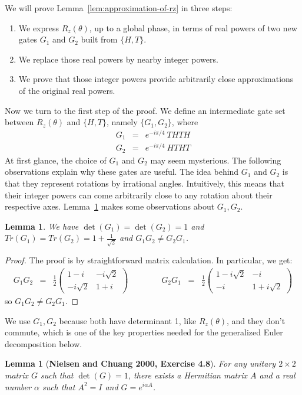 \documentclass[11pt]{article}
\def\({\begin{eqnarray*}}
\def\){\end{eqnarray*}}
\newtheorem{lemma}[theorem]{Lemma}
\begin{document}
We will prove Lemma~\ref{lem:approximation-of-rz} in three steps:
\begin{enumerate}
\item We express $R_z(\theta)$, up to a global phase, in terms of
real powers of two new gates $G_1$ and $G_2$ built from $\{H,T\}$.
\item We replace those real powers by nearby integer powers.
\item We prove that those integer powers provide arbitrarily close
approximations of the original real powers.
\end{enumerate}
%
Now we turn to the first step of the proof.
We define an intermediate gate set between $R_z(\theta)$ and
$\{H, T\}$, namely $\{G_1,G_2\}$, where
\(
G_1 &=& e^{-i\pi/4}\ THTH \\
G_2 &=& e^{-i\pi/4}\ HTHT
\)
At first glance, the choice of $G_1$ and $G_2$ may seem mysterious. 
The following observations explain why these gates are useful.
The idea behind $G_1$ and $G_2$ is that 
they represent rotations by irrational angles.
Intuitively, this means that their integer powers can come arbitrarily close to
any rotation about their respective axes.
Lemma~\ref{lem:properties-of-g1-g2} makes some observations about $G_1,G_2$.

\begin{lemma}
\label{lem:properties-of-g1-g2}
We have 
$\det(G_1) = \det(G_2) = 1$ and
$Tr(G_1) = Tr(G_2) = 1 + \frac{1}{\sqrt{2}}$ and
$G_1G_2 \neq G_2G_1$.
\end{lemma}

\begin{proof}
The proof is by straightforward matrix calculation.
In particular, we get:
\(
G_1G_2 &=& 
\frac{1}{2}
\left(
\begin{array}{cc}
1-i & -i\sqrt{2} \\
-i\sqrt{2} & 1+i
\end{array}
\right)
\quad \quad
\quad \quad
G_2G_1 \;\;=\;\;
\frac{1}{2}
\left(
\begin{array}{cc}
1-i\sqrt{2} & -i \\
-i & 1+i\sqrt{2}
\end{array}
\right)
\)
so $G_1G_2 \neq G_2G_1$.
\end{proof}

We use $G_1,G_2$ because both have determinant 1, like $R_z(\theta)$, and
they don't commute, which is one of the key properties needed for 
the generalized Euler decomposition below.

\begin{lemma}[\bf Nielsen and Chuang 2000, Exercise 4.8]
\label{lem:from-unitary-to-exponentiated-hamiltonian}
For any unitary $2 \times 2$ matrix $G$ such that $\det(G) = 1$,
there exists a Hermitian matrix $A$ and a real number $\alpha$
such that $A^2 = I$ and $G = e^{i\alpha A}$.
\end{lemma}
\end{document}
